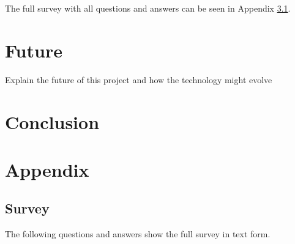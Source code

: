 \documentclass[12p]{article}
\begin{document}
		The full survey with all questions and answers can be seen in Appendix \ref{FullSurvey}.
		
		
		\newpage
		\section{Future} \label{sec:Future}
		
		Explain the future of this project and how the technology might evolve
		
		
		\newpage
		\section{Conclusion} \label{sec:Conclusion}
		
		
		\newpage
		\printbibliography[heading=bibintoc,title={References}]
		
		
		\newpage
		\appendix
		
		\section{Appendix}
		
		\subsection{Survey} \label{FullSurvey}
		
		The following questions and answers show the full survey in text form.
		
\end{document}

